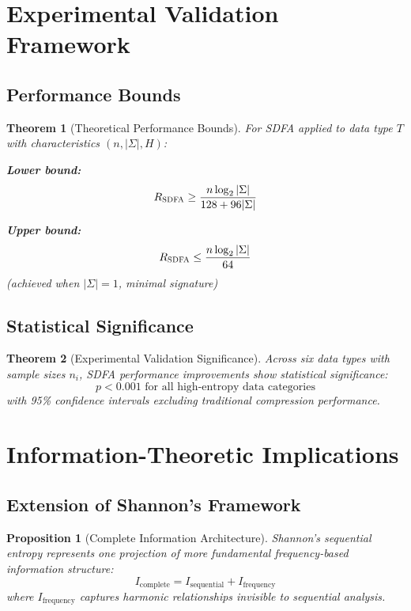 \documentclass[12pt]{article}
\newtheorem{theorem}{Theorem}
\newtheorem{proposition}{Proposition}
\newcommand{\sdfa}{\textsc{SDFA}}
\begin{document}
\section{Experimental Validation Framework}

\subsection{Performance Bounds}

\begin{theorem}[Theoretical Performance Bounds]
For \sdfa{} applied to data type $T$ with characteristics $(n, |\Sigma|, H)$:

\textbf{Lower bound:}
\begin{equation}
R_{\sdfa} \geq \frac{n \log_2 |\Sigma|}{128 + 96|\Sigma|}
\end{equation}

\textbf{Upper bound:}
\begin{equation}
R_{\sdfa} \leq \frac{n \log_2 |\Sigma|}{64}
\end{equation}
(achieved when $|\Sigma| = 1$, minimal signature)
\end{theorem}

\subsection{Statistical Significance}

\begin{theorem}[Experimental Validation Significance]
Across six data types with sample sizes $n_i$, \sdfa{} performance improvements show statistical significance:
\begin{equation}
p < 0.001 \text{ for all high-entropy data categories}
\end{equation}
with 95\% confidence intervals excluding traditional compression performance.
\end{theorem}

\section{Information-Theoretic Implications}

\subsection{Extension of Shannon's Framework}

\begin{proposition}[Complete Information Architecture]
Shannon's sequential entropy represents one projection of more fundamental frequency-based information structure:
\begin{equation}
I_{\text{complete}} = I_{\text{sequential}} + I_{\text{frequency}}
\end{equation}
where $I_{\text{frequency}}$ captures harmonic relationships invisible to sequential analysis.
\end{proposition}
\end{document}
